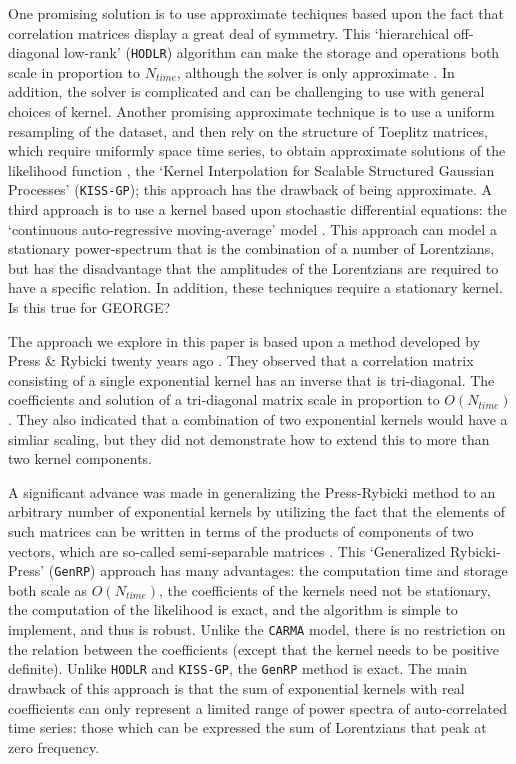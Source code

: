 \documentclass[manuscript, letterpaper]{aastex6}
\begin{document}
One promising solution is to use approximate techiques based upon the fact that correlation
matrices display a great deal of symmetry.  This `hierarchical off-diagonal low-rank' (\texttt{HODLR})
algorithm can make the storage and operations both scale in proportion to $N_{time}$, although the 
solver is only approximate \citep{Ambikasaran2013,Ambikasaran2016}.  In addition, the
solver is complicated and can be challenging to use with general choices of kernel.  Another
promising approximate technique is to use a uniform resampling of the dataset, and then
rely on the structure of Toeplitz matrices, which require uniformly space time series,
to obtain approximate solutions of the likelihood function \citep{WilsonNickisch2015},
the `Kernel Interpolation for Scalable Structured Gaussian Processes' (\texttt{KISS-GP});
this approach has the drawback of being approximate.  A third approach is to use a kernel
based upon stochastic differential equations:  the `continuous auto-regressive moving-average'
model \citep[aka \texttt{CARMA};][]{Kelly2014}.  This approach can model a stationary power-spectrum that
is the combination of a number of Lorentzians, but has the disadvantage that the amplitudes
of the Lorentzians are required to have a specific relation.  In addition, these
techniques require a stationary kernel. {\color{red} Is this true for GEORGE?}

The approach we explore in this paper is based upon a method developed by Press \&
Rybicki twenty years ago \citep{1995PhRvL..74.1060R}.  They observed that a correlation
matrix consisting of a single exponential kernel has an inverse that is tri-diagonal.
The coefficients and solution of a tri-diagonal matrix scale in proportion to $O(N_{time})$.
They also indicated that a combination of two exponential kernels would have a simliar scaling,
but they did not demonstrate how to extend this to more than two kernel components.

A significant advance was made in generalizing the Press-Rybicki method to an
arbitrary number of exponential kernels by utilizing the fact that the elements of
such matrices can be written in terms of the products of components of two vectors,
which are so-called semi-separable matrices \citep{Ambikasaran2015}.  This `Generalized
Rybicki-Press' (\texttt{GenRP}) approach
has many advantages:  the computation time and storage both scale as $O(N_{time})$,
the coefficients of the kernels need not be stationary, the computation of the
likelihood is exact, and the algorithm is simple to implement, and thus is robust.
Unlike the \texttt{CARMA} model, there is no restriction on the relation between
the coefficients (except that the kernel needs to be positive definite).  Unlike
\texttt{HODLR} and \texttt{KISS-GP},  the \texttt{GenRP} method is exact.  The main drawback 
of this approach is that the sum of exponential kernels with real coefficients can 
only represent a limited range of power spectra of auto-correlated time series:
those which can be expressed the sum of Lorentzians that peak at zero frequency.
\end{document}
